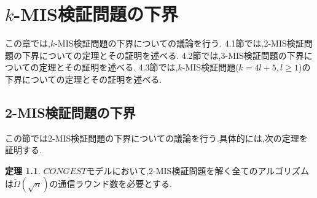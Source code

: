 \documentclass[12pt]{thesis}
\theoremstyle{definition}
\newtheorem{theorem}{定理}[chapter]
\begin{document}
\chapter{$k$-MIS検証問題の下界}
この章では,$k$-MIS検証問題の下界についての議論を行う.
4.1節では,2-MIS検証問題の下界についての定理とその証明を述べる.
4.2節では,3-MIS検証問題の下界についての定理とその証明を述べる.
4.3節では,$k$-MIS検証問題($k = 4l + 5, l \geq 1$)の下界についての定理とその証明を述べる.

\section{2-MIS検証問題の下界}

この節では2-MIS検証問題の下界についての議論を行う.具体的には,次の定理を証明する. 
\begin{theorem}
$CONGEST$モデルにおいて,2-MIS検証問題を解く全てのアルゴリズムは$\tilde{\Omega} (\sqrt{n})$の通信ラウンド数を必要とする.
\end{theorem}
\end{document}
